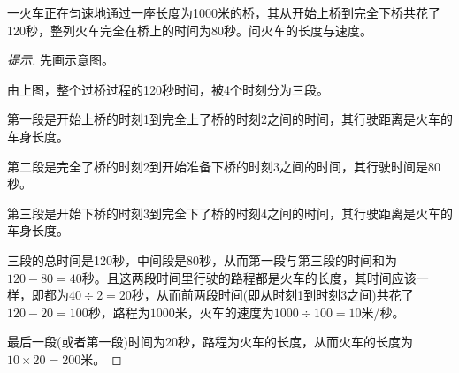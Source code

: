 \begin{example}[火车过桥]\label{ex:train-crossing-bridge}
  一火车正在匀速地通过一座长度为1000米的桥，其从开始上桥到完全下桥共花了120秒，整列火车完全在桥上的时间为80秒。问火车的长度与速度。
\end{example}
\begin{proof}[提示]
  先画示意图。
  \begin{center}
  \end{center}
  由上图，整个过桥过程的120秒时间，被4个时刻分为三段。

  第一段是开始上桥的时刻1到完全上了桥的时刻2之间的时间，其行驶距离是火车的车身长度。

  第二段是完全了桥的时刻2到开始准备下桥的时刻3之间的时间，其行驶时间是80秒。

  第三段是开始下桥的时刻3到完全下了桥的时刻4之间的时间，其行驶距离是火车的车身长度。

  三段的总时间是120秒，中间段是80秒，从而第一段与第三段的时间和为$120-80=40$秒。且这两段时间里行驶的路程都是火车的长度，其时间应该一样，即都为$40\div2=20$秒，从而前两段时间(即从时刻1到时刻3之间)共花了$120-20=100$秒，路程为$1000$米，火车的速度为$1000\div100=10$米/秒。

  最后一段(或者第一段)时间为$20$秒，路程为火车的长度，从而火车的长度为$10\times20=200$米。
\end{proof}

